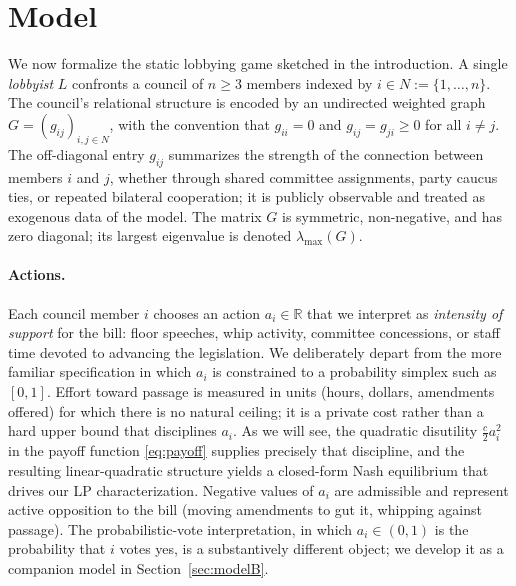 \documentclass[11pt,letterpaper]{article}
\theoremstyle{plain}
\theoremstyle{definition}
\theoremstyle{remark}
\begin{document}

\section{Model}
\label{sec:model}

We now formalize the static lobbying game sketched in the introduction. A single \emph{lobbyist} $L$ confronts a council of $n \geq 3$ members indexed by $i \in N := \{1, \ldots, n\}$. The council's relational structure is encoded by an undirected weighted graph $G = (g_{ij})_{i,j \in N}$, with the convention that $g_{ii} = 0$ and $g_{ij} = g_{ji} \geq 0$ for all $i \neq j$. The off-diagonal entry $g_{ij}$ summarizes the strength of the connection between members $i$ and $j$, whether through shared committee assignments, party caucus ties, or repeated bilateral cooperation; it is publicly observable and treated as exogenous data of the model. The matrix $G$ is symmetric, non-negative, and has zero diagonal; its largest eigenvalue is denoted $\lambda_{\max}(G)$.

\paragraph{Actions.} Each council member $i$ chooses an action $a_i \in \mathbb{R}$ that we interpret as \emph{intensity of support} for the bill: floor speeches, whip activity, committee concessions, or staff time devoted to advancing the legislation. We deliberately depart from the more familiar specification in which $a_i$ is constrained to a probability simplex such as $[0,1]$. Effort toward passage is measured in units (hours, dollars, amendments offered) for which there is no natural ceiling; it is a private cost rather than a hard upper bound that disciplines $a_i$. As we will see, the quadratic disutility $\tfrac{c}{2}a_i^2$ in the payoff function \eqref{eq:payoff} supplies precisely that discipline, and the resulting linear-quadratic structure yields a closed-form Nash equilibrium that drives our LP characterization. Negative values of $a_i$ are admissible and represent active opposition to the bill (moving amendments to gut it, whipping against passage). The probabilistic-vote interpretation, in which $a_i \in (0,1)$ is the probability that $i$ votes yes, is a substantively different object; we develop it as a companion model in Section~\ref{sec:modelB}.
\end{document}

